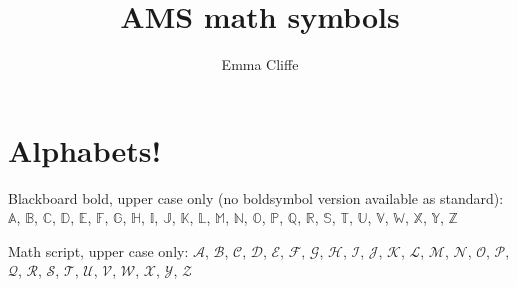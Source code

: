\usepackage[mathscr]{eucal}
\usepackage{eufrak} 
\usepackage{longtable} 
\usepackage{spverbatim} 
\usepackage{url} 
\newtheorem{theorem}{Theorem}[section]
\title{AMS math symbols}
\author{Emma Cliffe}
\date{}
\pagestyle{headings}
\usepackage{calc}
\usepackage{longtable}
\usepackage{tabu}
\usepackage{breqn}
\setlength{\arraycolsep}{0.800000em}
\renewcommand{\arraystretch}{1.400000}

\renewcommand{\baselinestretch}{1.250000}
\selectfont
\setlength{\parskip}{1.0\baselineskip}


\maketitle

\section{Alphabets!}

\noindent 
Blackboard bold, upper case only (no boldsymbol version available as standard):
\(\mathbb{A}\), \(\mathbb{B}\), \(\mathbb{C}\), \(\mathbb{D}\), \(\mathbb{E}\), \(\mathbb{F}\), \(\mathbb{G}\), \(\mathbb{H}\), \(\mathbb{I}\), \(\mathbb{J}\), \(\mathbb{K}\), \(\mathbb{L}\), \(\mathbb{M}\), \(\mathbb{N}\), \(\mathbb{O}\), \(\mathbb{P}\), \(\mathbb{Q}\), \(\mathbb{R}\), \(\mathbb{S}\), \(\mathbb{T}\), \(\mathbb{U}\), \(\mathbb{V}\), \(\mathbb{W}\), \(\mathbb{X}\), \(\mathbb{Y}\), \(\mathbb{Z}\)

\bigskip

\noindent
Math script, upper case only:
\(\mathscr{A}\), \(\mathscr{B}\), \(\mathscr{C}\), \(\mathscr{D}\), \(\mathscr{E}\), \(\mathscr{F}\), \(\mathscr{G}\), \(\mathscr{H}\), \(\mathscr{I}\), \(\mathscr{J}\), \(\mathscr{K}\), \(\mathscr{L}\), \(\mathscr{M}\), \(\mathscr{N}\), \(\mathscr{O}\), \(\mathscr{P}\), \(\mathscr{Q}\), \(\mathscr{R}\), \(\mathscr{S}\), \(\mathscr{T}\), \(\mathscr{U}\), \(\mathscr{V}\), \(\mathscr{W}\), \(\mathscr{X}\), \(\mathscr{Y}\), \(\mathscr{Z}\)

